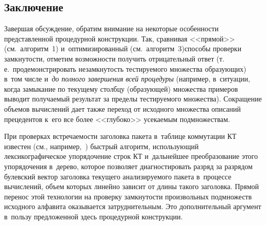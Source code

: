 \begin{multicols}{2}
\vspace*{-3pt}



\section{Заключение}

\vspace*{-3pt}

    Завершая обсуждение, обратим внимание на некоторые особенности 
представленной процедурной конструкции. Так, сравнивая <<прямой>> (см.\ 
алгоритм~1) и~оптимизированный (см.\ алгоритм~3)\linebreak способы проверки 
замкнутости, отметим возможности получить отрицательный ответ (т.\,е.\ 
продемонстрировать незамкнутость тестируемого множества образующих) 
в~том числе и~\textit{до полного\linebreak
 завершения всей процедуры} (например, 
в~ситуации, когда замыкание по текущему столбцу (обра\-зу\-ющей) множества 
примеров выводит получаемый результат за пределы тестируемого 
множества). Сокращение объемов вычислений дает также переход от 
исходного множества описаний прецедентов к~его все более <<глубоко>> 
усекаемым подмножествам. 
    
    При проверках встречаемости заголовка пакета в~таблице коммутации 
КТ известен (см., например,~\cite{7-zab}) быстрый алгоритм, использующий 
лексикографическое упорядочение строк КТ и~дальнейшее преобразование 
этого упорядочения в~дерево, которое позволяет диагностировать разряд за 
разрядом булевский вектор заголовка текущего анализируемого пакета 
в~процессе вычислений, объем которых линейно зависит от длины такого 
заголовка. Прямой перенос этой технологии на проверку замк\-ну\-тости 
произвольных подмножеств исходного алфавита оказывается 
затруднительным. Это дополнительный аргумент в~пользу предложенной 
здесь процедурной конструкции.
    

\end{multicols}
